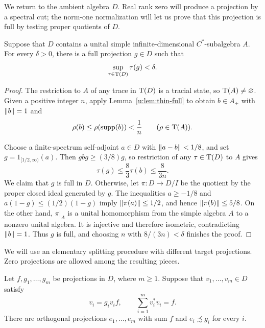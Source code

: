 We return to the ambient algebra $D$. Real rank zero will produce a
projection by a spectral cut; the norm-one normalization will let us prove
that this projection is full by testing proper quotients of $D$.

\begin{lemma}\label{r:proj:small}
Suppose that $D$ contains a unital simple infinite-dimensional
$C^*$-subalgebra $A$.  For every $\delta>0$, there is a full projection
$g\in D$ such that
\[
  \sup_{\tau\in\operatorname T(D)}\tau(g)<\delta.
\]
\end{lemma}

\begin{proof}
The restriction to $A$ of any trace in $\operatorname T(D)$ is a tracial state,
so $\operatorname T(A)\ne\varnothing$. Given a positive integer $n$, apply
Lemma~\ref{u:lem:thin-full} to obtain $b\in A_+$ with $\lVert b\rVert=1$ and
\begin{equation}\label{r:proj:small-positive}
 \rho(b)\le\rho(\operatorname{supp}(b))<\frac1n
 \qquad(\rho\in\operatorname T(A)).
\end{equation}

Choose a finite-spectrum self-adjoint $a\in D$ with
$\lVert a-b\rVert<1/8$, and set $g=1_{[1/2,\infty)}(a)$.  Then
$gbg\ge(3/8)g$, so restriction of any $\tau\in\operatorname T(D)$ to $A$ gives
\begin{equation}\label{r:proj:small-projection-bound}
  \tau(g)\le\frac83\tau(b)\le\frac{8}{3n}.
\end{equation}
We claim that $g$ is full in $D$.  Otherwise, let $\pi:D\to D/I$ be the quotient
by the proper closed ideal generated by $g$.  The inequalities
$a\ge-1/8$ and $a(1-g)\le(1/2)(1-g)$ imply
$\lVert\pi(a)\rVert\le1/2$, and hence $\lVert\pi(b)\rVert\le5/8$.
On the other hand, $\pi|_A$ is a unital homomorphism from the simple
algebra $A$ to a nonzero unital algebra.  It is injective and therefore
isometric, contradicting $\lVert b\rVert=1$.  Thus $g$ is full, and choosing
$n$ with $8/(3n)<\delta$ finishes the proof.
\end{proof}

We will use an elementary splitting procedure with different target
projections.  Zero projections are allowed among the resulting pieces.

\begin{lemma}\label{r:proj:columns}
Let $f,g_1,\ldots,g_m$ be projections in $D$, where $m\ge1$.
Suppose that $v_1,\ldots,v_m\in D$ satisfy
\[
  v_i=g_i v_i f,
  \qquad \sum_{i=1}^m v_i^*v_i=f.
\]
There are orthogonal projections $e_1,\ldots,e_m$ with sum $f$ and
$e_i\precsim g_i$ for every $i$.
\end{lemma}

